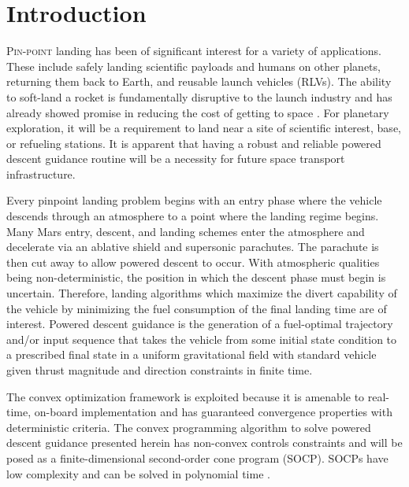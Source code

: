\documentclass[conf]{new-aiaa}
\begin{document}
% 

\section{Introduction}
\lettrine{P}{in-point} landing has been of significant interest for a variety of applications. These include safely landing scientific payloads and humans on other planets, returning them back to Earth, and reusable launch vehicles (RLVs). The ability to soft-land a rocket is fundamentally disruptive to the launch industry and has already showed promise in reducing the cost of getting to space \cite{jones2018recent}. For planetary exploration, it will be a requirement to land near a site of scientific interest, base, or refueling stations. It is apparent that having a robust and reliable powered descent guidance routine will be a necessity for future space transport infrastructure.

Every pinpoint landing problem begins with an entry phase where the vehicle descends through an atmosphere to a point where the landing regime begins. Many Mars entry, descent, and landing schemes enter the atmosphere and decelerate via an ablative shield and supersonic parachutes. The parachute is then cut away to allow powered descent to occur. With atmospheric qualities being non-deterministic, the position in which the descent phase must begin is uncertain. Therefore, landing algorithms which maximize the divert capability of the vehicle by minimizing the fuel consumption of the final landing time are of interest. Powered descent guidance is the generation of a fuel-optimal trajectory and/or input sequence that takes the vehicle from some initial state condition to a prescribed final state in a uniform gravitational field with standard vehicle given thrust magnitude and direction constraints in finite time.

The convex optimization framework is exploited because it is amenable to real-time, on-board implementation and has guaranteed convergence properties with deterministic criteria. The convex programming algorithm to solve powered descent guidance presented herein has non-convex controls constraints and will be posed as a finite-dimensional second-order cone program (SOCP). SOCPs have low complexity and can be solved in polynomial time \cite{boyd2004convex}.
\end{document}
